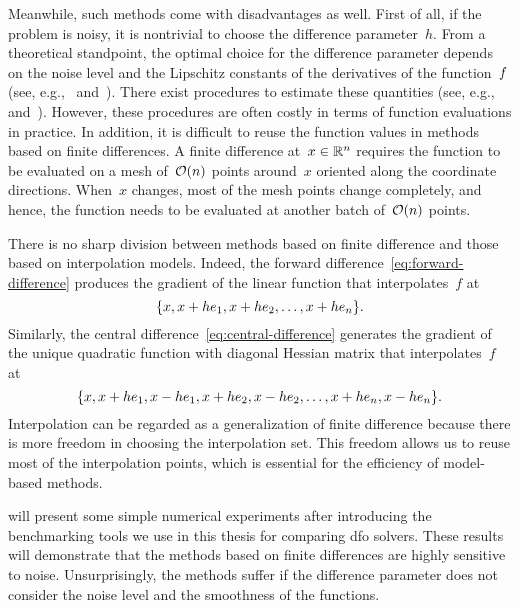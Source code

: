Meanwhile, such methods come with disadvantages as well.
First of all, if the problem is noisy, it is nontrivial to choose the difference parameter~$h$.
From a theoretical standpoint, the optimal choice for the difference parameter depends on the noise level and the Lipschitz constants of the derivatives of the function~$f$ (see, e.g.,~\cite[\S~8.1]{Nocedal_Wright_2006} and~\cite[eq.~(2.13) and~(2.14)]{Shi_Etal_2021}).
There exist procedures to estimate these quantities (see, e.g.,~\cite[\S~3]{More_Wild_2011} and~\cite[proc.~I]{Shi_Etal_2021}).
However, these procedures are often costly in terms of function evaluations in practice.
In addition, it is difficult to reuse the function values in methods based on finite differences.
A finite difference at~$x \in \mathbb{R}^n$ requires the function to be evaluated on a mesh of~$\operatorname{\mathcal{O}}(n)$ points around~$x$ oriented along the coordinate directions.
When~$x$ changes, most of the mesh points change completely, and hence, the function needs to be evaluated at another batch of~$\operatorname{\mathcal{O}}(n)$ points.

There is no sharp division between methods based on finite difference and those based on interpolation models.
Indeed, the forward difference~\cref{eq:forward-difference} produces the gradient of the linear function that interpolates~$f$ at
\begin{equation*}
    \{x, x + h e_1, x + h e_2, \dots, x + h e_n\}.
\end{equation*}
Similarly, the central difference~\cref{eq:central-difference} generates the gradient of the unique quadratic function with diagonal Hessian matrix that interpolates~$f$ at
\begin{equation*}
    \{x, x + h e_1, x - h e_1, x + h e_2, x - h e_2, \dots, x + h e_n, x - h e_n\}.
\end{equation*}
Interpolation can be regarded as a generalization of finite difference because there is more freedom in choosing the interpolation set.
This freedom allows us to reuse most of the interpolation points, which is essential for the efficiency of model-based methods.

 will present some simple numerical experiments after introducing the benchmarking tools we use in this thesis for comparing \gls{dfo} solvers.
These results will demonstrate that the methods based on finite differences are highly sensitive to noise.
Unsurprisingly, the methods suffer if the difference parameter does not consider the noise level and the smoothness of the functions.

